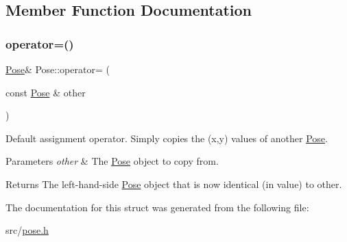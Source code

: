 \subsection{Member Function Documentation}
\mbox{\label{struct_pose_aec0a9478daefa358aa2f1873cbaf0271}} 
\subsubsection{\texorpdfstring{operator=()}{operator=()}}
{\footnotesize\ttfamily \mbox{\hyperlink{struct_pose}{Pose}}\& Pose\+::operator= (\begin{DoxyParamCaption}\item[{const \mbox{\hyperlink{struct_pose}{Pose}} \&}]{other }\end{DoxyParamCaption})\hspace{0.3cm}{\ttfamily [default]}}



Default assignment operator. Simply copies the (x,y) values of another \mbox{\hyperlink{struct_pose}{Pose}}. 


\begin{DoxyParams}{Parameters}
{\em other} & The \mbox{\hyperlink{struct_pose}{Pose}} object to copy from.\\
\hline
\end{DoxyParams}
\begin{DoxyReturn}{Returns}
The left-\/hand-\/side \mbox{\hyperlink{struct_pose}{Pose}} object that is now identical (in value) to {\ttfamily other}. 
\end{DoxyReturn}


The documentation for this struct was generated from the following file\+:\begin{DoxyCompactItemize}
\item 
src/\mbox{\hyperlink{pose_8h}{pose.\+h}}\end{DoxyCompactItemize}
